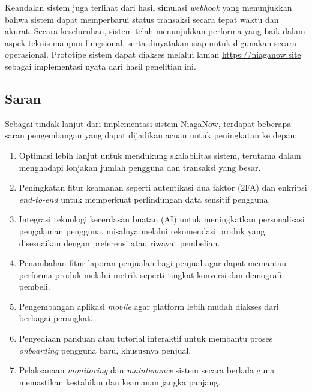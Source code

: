 \documentclass[12pt,a4paper,twocolumn]{article}
\begin{document}
Keandalan sistem juga terlihat dari hasil simulasi \textit{webhook} yang menunjukkan bahwa sistem dapat memperbarui status transaksi secara tepat waktu dan akurat. Secara keseluruhan, sistem telah menunjukkan performa yang baik dalam aspek teknis maupun fungsional, serta dinyatakan siap untuk digunakan secara operasional. Prototipe sistem dapat diakses melalui laman \url{https://niaganow.site} sebagai implementasi nyata dari hasil penelitian ini.

\subsection{Saran}

Sebagai tindak lanjut dari implementasi sistem NiagaNow, terdapat beberapa saran pengembangan yang dapat dijadikan acuan untuk peningkatan ke depan:
\begin{enumerate}
    \item Optimasi lebih lanjut untuk mendukung skalabilitas sistem, terutama dalam menghadapi lonjakan jumlah pengguna dan transaksi yang besar.
    \item Peningkatan fitur keamanan seperti autentikasi dua faktor (2FA) dan enkripsi \textit{end-to-end} untuk memperkuat perlindungan data sensitif pengguna.
    \item Integrasi teknologi kecerdasan buatan (AI) untuk meningkatkan personalisasi pengalaman pengguna, misalnya melalui rekomendasi produk yang disesuaikan dengan preferensi atau riwayat pembelian.
    \item Penambahan fitur laporan penjualan bagi penjual agar dapat memantau performa produk melalui metrik seperti tingkat konversi dan demografi pembeli.
    \item Pengembangan aplikasi \textit{mobile} agar platform lebih mudah diakses dari berbagai perangkat.
    \item Penyediaan panduan atau tutorial interaktif untuk membantu proses \textit{onboarding} pengguna baru, khususnya penjual.
    \item Pelaksanaan \textit{monitoring} dan \textit{maintenance} sistem secara berkala guna memastikan kestabilan dan keamanan jangka panjang.
\end{enumerate}

% 
\end{document}
